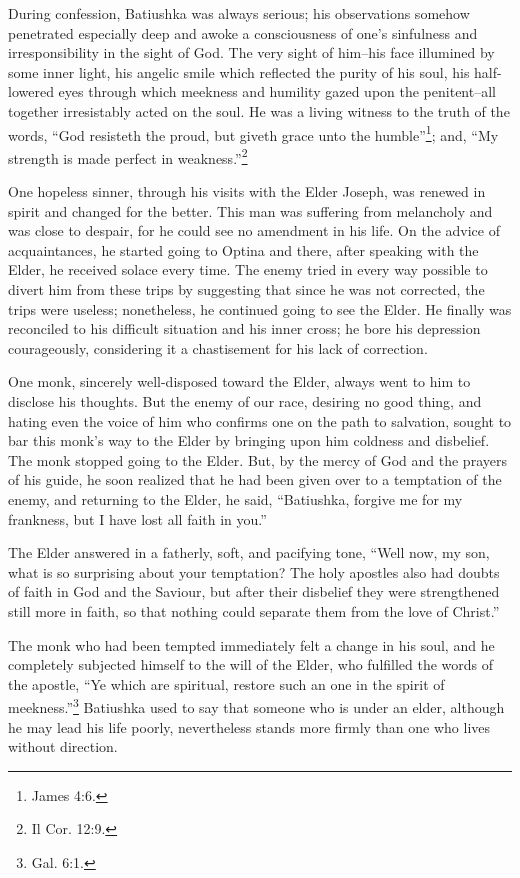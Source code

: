 During confession, Batiushka was always serious; his observations somehow penetrated especially deep and awoke a consciousness of one's sinfulness and irresponsibility in the sight of God. The very sight of him--his face illumined by some inner light, his angelic smile which reflected the purity of his soul, his half-lowered eyes through which meekness and humility gazed upon the penitent--all together irresistably acted on the soul. He was a living witness to the truth of the words, “God resisteth the proud, but giveth grace unto the humble”\footnote{James 4:6.}; and, “My strength is made perfect in weakness.”\footnote{Il Cor. 12:9.}

One hopeless sinner, through his visits with the Elder Joseph, was renewed in spirit and changed for the better. This man was suffering from melancholy and was close to despair, for he could see no amendment in his life. On the advice of acquaintances, he started going to Optina and there, after speaking with the Elder, he received solace every time. The enemy tried in every way possible to divert him from these trips by suggesting that since he was not corrected, the trips were useless; nonetheless, he continued going to see the Elder. He finally was reconciled to his difficult situation and his inner cross; he bore his depression courageously, considering it a chastisement for his lack of correction.

One monk, sincerely well-disposed toward the Elder, always went to him to disclose his thoughts. But the enemy of our race, desiring no good thing, and hating even the voice of him who confirms one on the path to salvation, sought to bar this monk's way to the Elder by bringing upon him coldness and disbelief. The monk stopped going to the Elder. But, by the mercy of God and the prayers of his guide, he soon realized that he had been given over to a temptation of the enemy, and returning to the Elder, he said, “Batiushka, forgive me for my frankness, but I have lost all faith in you.”

The Elder answered in a fatherly, soft, and pacifying tone, “Well now, my son, what is so surprising about your temptation? The holy apostles also had doubts of faith in God and the Saviour, but after their disbelief they were strengthened still more in faith, so that nothing could separate them from the love of Christ.”

The monk who had been tempted immediately felt a change in his soul, and he completely subjected himself to the will of the Elder, who fulfilled the words of the apostle, “Ye which are spiritual, restore such an one in the spirit of meekness.''\footnote{Gal. 6:1.} Batiushka used to say that someone who is under an elder, although he may lead his life poorly, nevertheless stands more firmly than one who lives without direction.

